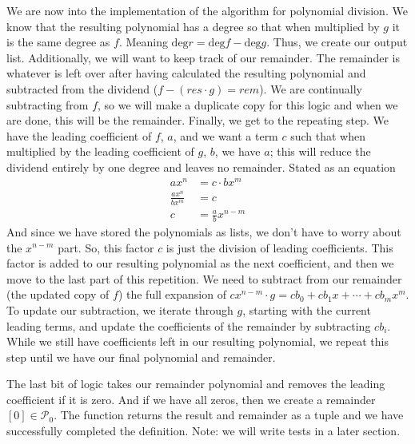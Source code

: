 \documentclass[]{article}
\theoremstyle{definition}
\begin{document}
We are now into the implementation of the algorithm for polynomial division. We know that the resulting polynomial has a degree so that when multiplied by $g$ it is the same degree as $f$. Meaning $\textrm{deg}r = \textrm{deg}f - \textrm{deg}g$. Thus, we create our output list. Additionally, we will want to keep track of our remainder. The remainder is whatever is left over after having calculated the resulting polynomial and subtracted from the dividend ($f - (res \cdot g) = rem$). We are continually subtracting from $f$, so we will make a duplicate copy for this logic and when we are done, this will be the remainder. Finally, we get to the repeating step. We have the leading coefficient of $f$, $a$, and we want a term $c$ such that when multiplied by the leading coefficient of $g$, $b$, we have $a$; this will reduce the dividend entirely by one degree and leaves no remainder. Stated as an equation
\begin{align*}
ax^n &= c \cdot bx^m \\
\frac{ax^n}{bx^m} &= c \\
c &= \frac{a}{b}x^{n-m}
\end{align*}
And since we have stored the polynomials as lists, we don't have to worry about the $x^{n-m}$ part. So, this factor $c$ is just the division of leading coefficients. This factor is added to our resulting polynomial as the next coefficient, and then we move to the last part of this repetition. We need to subtract from our remainder (the updated copy of $f$) the full expansion of $cx^{n-m} \cdot g = cb_0 + cb_1x + \cdots + cb_mx^m$. To update our subtraction, we iterate through $g$, starting with the current leading terms, and update the coefficients of the remainder by subtracting $cb_i$. While we still have coefficients left in our resulting polynomial, we repeat this step until we have our final polynomial and remainder. 

The last bit of logic takes our remainder polynomial and removes the leading coefficient if it is zero. And if we have all zeros, then we create a remainder $[0] \in \mathcal{P}_0$. The function returns the result and remainder as a tuple and we have successfully completed the definition. Note: we will write tests in a later section.
\end{document}

